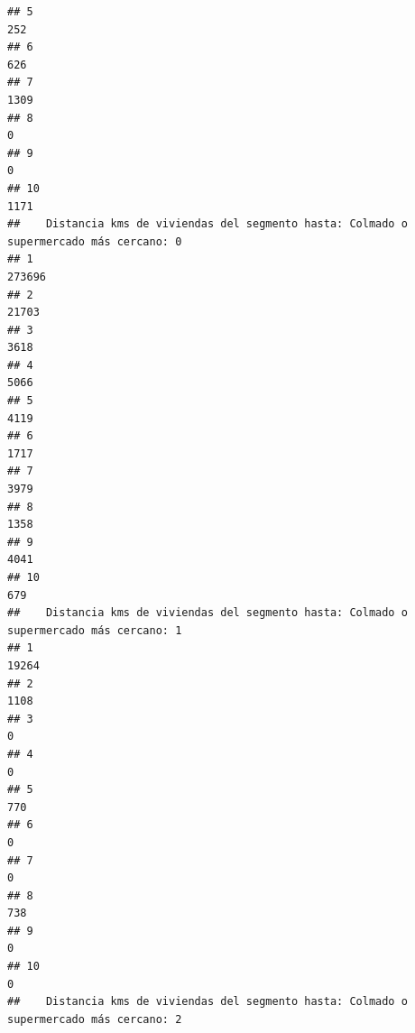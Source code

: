 \documentclass[11pt,]{article}
\begin{document}
\begin{verbatim}
## 5                                                                                252
## 6                                                                                626
## 7                                                                               1309
## 8                                                                                  0
## 9                                                                                  0
## 10                                                                              1171
##    Distancia kms de viviendas del segmento hasta: Colmado o supermercado más cercano: 0
## 1                                                                                273696
## 2                                                                                 21703
## 3                                                                                  3618
## 4                                                                                  5066
## 5                                                                                  4119
## 6                                                                                  1717
## 7                                                                                  3979
## 8                                                                                  1358
## 9                                                                                  4041
## 10                                                                                  679
##    Distancia kms de viviendas del segmento hasta: Colmado o supermercado más cercano: 1
## 1                                                                                 19264
## 2                                                                                  1108
## 3                                                                                     0
## 4                                                                                     0
## 5                                                                                   770
## 6                                                                                     0
## 7                                                                                     0
## 8                                                                                   738
## 9                                                                                     0
## 10                                                                                    0
##    Distancia kms de viviendas del segmento hasta: Colmado o supermercado más cercano: 2

\end{verbatim}
\end{document}
